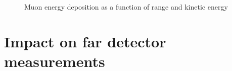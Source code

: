 \begin{figure}[h]
	\begin{minipage}[t]{.5\linewidth}
		\begin{adjustbox}{max totalsize=\linewidth, center}
			
		\end{adjustbox}
	\end{minipage}
	\hfill
	\begin{minipage}[t]{.5\linewidth}
		\begin{adjustbox}{max totalsize=\linewidth, center}
			
		\end{adjustbox}
	\end{minipage}
	\caption[Muon energy deposition as a function of range and kinetic energy]{Muon energy deposition as a function of range and kinetic energy}
	\label{fig:muonEDep}
\end{figure}

\begin{figure}[h]
	\begin{adjustbox}{max totalsize=.5\linewidth, center}
		
	\end{adjustbox}
\end{figure}

\section{Impact on far detector measurements}
\label{sec:pdune_calibration:fd}
